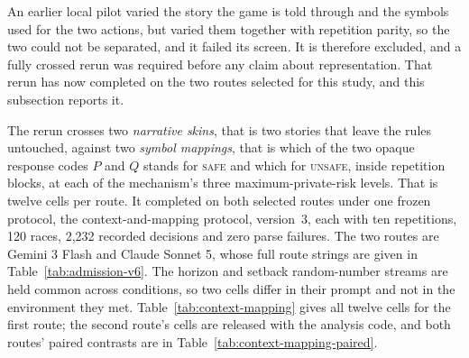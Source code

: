 \documentclass[sigconf,anonymous]{aamas}
\newcommand{\Safe}{\textsc{safe}}
\newcommand{\Unsafe}{\textsc{unsafe}}
\begin{document}
An earlier local pilot varied the story the game is told through and the
symbols used for the two actions, but varied them together with repetition
parity, so the two could not be separated, and it failed its screen. It is
therefore excluded, and a fully crossed rerun was required before any claim
about representation. That rerun has now completed on the two
routes selected for this study, and this subsection reports it.

The rerun crosses two \emph{narrative skins}, that is two stories that leave
the rules untouched, against two \emph{symbol mappings}, that is which of the
two opaque response codes $P$ and $Q$ stands for \Safe{} and which for
\Unsafe{}, inside repetition blocks, at each of the mechanism's three
maximum-private-risk levels. That is twelve cells per route. It completed on
both selected routes under one frozen protocol, the context-and-mapping
protocol, version~3, each with ten
repetitions, 120 races, 2{,}232 recorded decisions and zero parse failures.
The two routes are Gemini 3 Flash and Claude Sonnet 5, whose full
route strings are given in
Table~\ref{tab:admission-v6}. The horizon and
setback random-number streams are held common across conditions, so two cells
differ in their prompt and not in the environment they met.
Table~\ref{tab:context-mapping} gives all twelve cells for the first route;
the second route's cells are released with the analysis code, and both routes'
paired contrasts are in
Table~\ref{tab:context-mapping-paired}.
\end{document}
